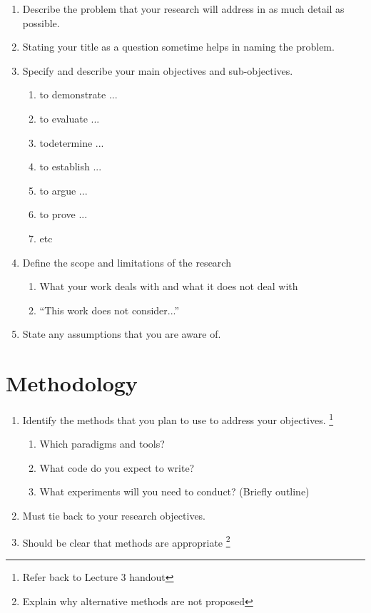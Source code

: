 \documentclass[runningheads,a4paper]{llncs}
\begin{document}
\begin{enumerate}
 \item Describe the problem that your research will address in as much detail as possible.
 \item Stating your title as a question sometime helps in naming the problem.
 \item Specify and describe your main objectives and sub-objectives.
 \begin{enumerate}
  \item to demonstrate ...
  \item to evaluate ...
  \item todetermine ...
  \item to establish ...
  \item to argue ...
  \item to prove ...
  \item etc
 \end{enumerate}
  \item Define the scope and limitations of the research
  \begin{enumerate}
   \item What your work deals with and what it does not deal with
   \item ``This work does not consider...''
  \end{enumerate}
  \item State any assumptions that you are aware of.
\end{enumerate}

\section{Methodology}

\begin{enumerate}
 \item Identify the methods that you plan to use to address your objectives. \footnote{Refer back to Lecture 3 handout}
 \begin{enumerate}
  \item Which paradigms and tools?
  \item What code do you expect to write?
  \item What experiments will you need to conduct? (Briefly outline)
 \end{enumerate}
 \item Must tie back to your research objectives.
 \item Should be clear that methods are appropriate \footnote{Explain why alternative methods are not proposed}

\end{enumerate}
\end{document}
